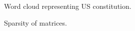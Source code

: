 \documentclass[12pt]{article} %
\begin{document}
\begin{figure}[H]
	\vspace{-10mm}
	\caption{Word cloud representing US constitution.}
\end{figure}

\begin{figure}[H]
	\vspace{-10mm}
	\caption{Sparsity of matrices.}
\end{figure}
\end{document}
